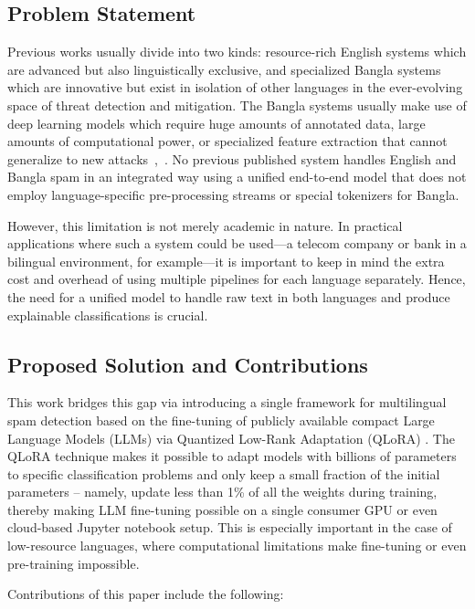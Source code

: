 \documentclass[journal]{IEEEtran}
\begin{document}
\subsection{Problem Statement}

Previous works usually divide into two kinds: resource-rich English
systems which are advanced but also linguistically exclusive, and
specialized Bangla systems which are innovative but exist in isolation
of other languages in the ever-evolving space of threat detection and
mitigation. The Bangla systems usually make use of deep learning models
which require huge amounts of annotated data, large amounts of
computational power, or specialized feature extraction that cannot
generalize to new attacks~\cite{ref7},~\cite{ref10}. No previous published system
handles English and Bangla spam in an integrated way using a unified
end-to-end model that does not employ language-specific pre-processing
streams or special tokenizers for Bangla.

However, this limitation is not merely academic in nature. In practical
applications where such a system could be used---a telecom company or
bank in a bilingual environment, for example---it is important to keep
in mind the extra cost and overhead of using multiple pipelines for each
language separately. Hence, the need for a unified model to handle raw
text in both languages and produce explainable classifications is
crucial.

\subsection{Proposed Solution and Contributions}

This work bridges this gap via introducing a single framework for
multilingual spam detection based on the fine-tuning of publicly
available compact Large Language Models (LLMs) via Quantized Low-Rank
Adaptation (QLoRA) \cite{ref11}. The QLoRA technique makes it possible to adapt
models with billions of parameters to specific classification problems
and only keep a small fraction of the initial parameters -- namely,
update less than 1\% of all the weights during training, thereby making
LLM fine-tuning possible on a single consumer GPU or even cloud-based
Jupyter notebook setup. This is especially important in the case of
low-resource languages, where computational limitations make fine-tuning
or even pre-training impossible.

Contributions of this paper include the following:
\end{document}
